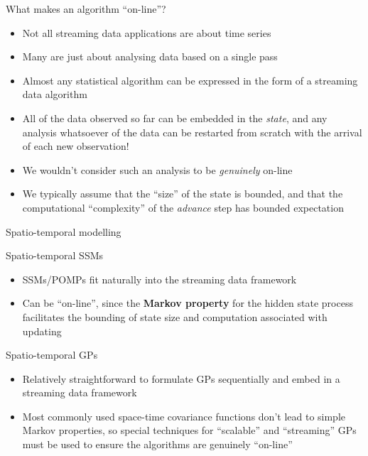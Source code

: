 \begin{frame}{What makes an algorithm ``on-line''?}
\protect\hypertarget{what-makes-an-algorithm-on-line}{}

\begin{itemize}
\tightlist
\item
  Not all streaming data applications are about time series
\item
  Many are just about analysing data based on a single pass
\item
  Almost any statistical algorithm can be expressed in the form of a
  streaming data algorithm
\item
  All of the data observed so far can be embedded in the \emph{state},
  and any analysis whatsoever of the data can be restarted from scratch
  with the arrival of each new observation!
\item
  We wouldn't consider such an analysis to be \emph{genuinely} on-line
\item
  We typically assume that the ``size'' of the state is bounded, and
  that the computational ``complexity'' of the \emph{advance} step has
  bounded expectation
\end{itemize}

\end{frame}

\begin{frame}{Spatio-temporal modelling}
\protect\hypertarget{spatio-temporal-modelling}{}

\begin{block}{Spatio-temporal SSMs}

\begin{itemize}
\tightlist
\item
  SSMs/POMPs fit naturally into the streaming data framework
\item
  Can be ``on-line'', since the \textbf{Markov property} for the hidden
  state process facilitates the bounding of state size and computation
  associated with updating
\end{itemize}

\end{block}

\begin{block}{Spatio-temporal GPs}

\begin{itemize}
\tightlist
\item
  Relatively straightforward to formulate GPs sequentially and embed in
  a streaming data framework
\item
  Most commonly used space-time covariance functions don't lead to
  simple Markov properties, so special techniques for ``scalable'' and
  ``streaming'' GPs must be used to ensure the algorithms are genuinely
  ``on-line''
\end{itemize}

\end{block}

\end{frame}

